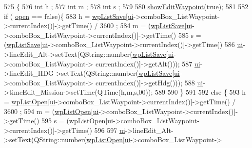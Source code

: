 \begin{DoxyCode}
575                     \{
576     \textcolor{keywordtype}{int} h ;
577     \textcolor{keywordtype}{int} m ;
578     \textcolor{keywordtype}{int} s ;
579 
580    \hyperlink{a00008_a35f9f0904259437c4ae21b41c4f759c1}{showEditWaypoint}(\textcolor{keyword}{true});
581 
582      \textcolor{keywordflow}{if} ( \hyperlink{a00008_a8c7e45250b1eb6821dd59fb2a9a016d7}{open} == \textcolor{keyword}{false})\{
583         h = \hyperlink{a00008_ad11e2550a13b49086c06cf1c1dbf0a45}{wpListSave}[\hyperlink{a00008_a6dc041ef6a2ffb329928d2913e8344e6}{ui}->comboBox\_ListWaypoint->currentIndex()]->getTime() / 3600 ;
584         m = (\hyperlink{a00008_ad11e2550a13b49086c06cf1c1dbf0a45}{wpListSave}[\hyperlink{a00008_a6dc041ef6a2ffb329928d2913e8344e6}{ui}->comboBox\_ListWaypoint->currentIndex()]->getTime() %
585         s = (\hyperlink{a00008_ad11e2550a13b49086c06cf1c1dbf0a45}{wpListSave}[\hyperlink{a00008_a6dc041ef6a2ffb329928d2913e8344e6}{ui}->comboBox\_ListWaypoint->currentIndex()]->getTime() %
586        \hyperlink{a00008_a6dc041ef6a2ffb329928d2913e8344e6}{ui}->lineEdit\_Alt->setText(QString::number(\hyperlink{a00008_ad11e2550a13b49086c06cf1c1dbf0a45}{wpListSave}[\hyperlink{a00008_a6dc041ef6a2ffb329928d2913e8344e6}{ui}->comboBox\_ListWaypoint->
      currentIndex()]->getAlt()));
587        \hyperlink{a00008_a6dc041ef6a2ffb329928d2913e8344e6}{ui}->lineEdit\_HDG->setText(QString::number(\hyperlink{a00008_ad11e2550a13b49086c06cf1c1dbf0a45}{wpListSave}[\hyperlink{a00008_a6dc041ef6a2ffb329928d2913e8344e6}{ui}->comboBox\_ListWaypoint->
      currentIndex()]->getHdg()));
588        \hyperlink{a00008_a6dc041ef6a2ffb329928d2913e8344e6}{ui}->timeEdit\_Mission->setTime(QTime(h,m,s,00));
589 
590     \}
591 
592     \textcolor{keywordflow}{else} \{
593         h = \hyperlink{a00008_a5d3a9439b166172c9c871c9a723eac19}{wpListOpen}[\hyperlink{a00008_a6dc041ef6a2ffb329928d2913e8344e6}{ui}->comboBox\_ListWaypoint->currentIndex()]->getTime() / 3600 ;
594         m = (\hyperlink{a00008_a5d3a9439b166172c9c871c9a723eac19}{wpListOpen}[\hyperlink{a00008_a6dc041ef6a2ffb329928d2913e8344e6}{ui}->comboBox\_ListWaypoint->currentIndex()]->getTime() %
595         s = (\hyperlink{a00008_a5d3a9439b166172c9c871c9a723eac19}{wpListOpen}[\hyperlink{a00008_a6dc041ef6a2ffb329928d2913e8344e6}{ui}->comboBox\_ListWaypoint->currentIndex()]->getTime() %
596 
597        \hyperlink{a00008_a6dc041ef6a2ffb329928d2913e8344e6}{ui}->lineEdit\_Alt->setText(QString::number(\hyperlink{a00008_a5d3a9439b166172c9c871c9a723eac19}{wpListOpen}[\hyperlink{a00008_a6dc041ef6a2ffb329928d2913e8344e6}{ui}->comboBox\_ListWaypoint->

\end{DoxyCode}
